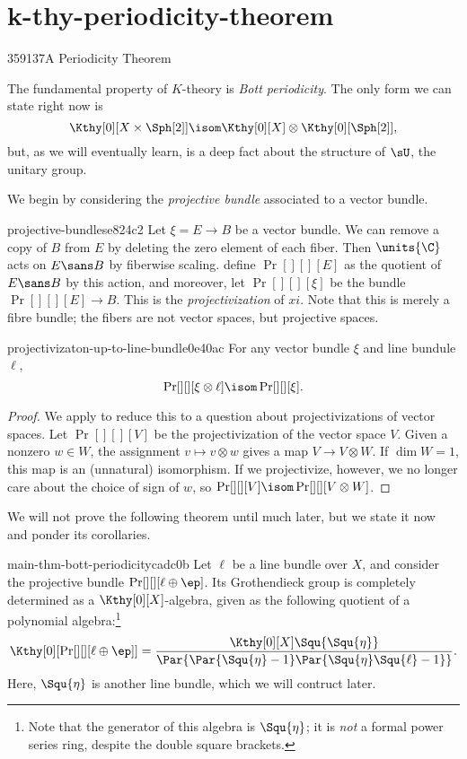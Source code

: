 \section{k-thy-periodicity-theorem}{359137}{A Periodicity Theorem}

The fundamental property of $K$-theory is \emph{Bott periodicity}. The only form we can
state right now is
\[ \Kthy[0][X \times {\Sph[2]}] \isom \Kthy[0][X] \otimes \Kthy[0][{\Sph[2]}], \]
but, as we will eventually learn, is a deep fact about the structure of $\sU$, the unitary
group.

We begin by considering the \emph{projective bundle} associated to a vector bundle.
\begin{defn}{projective-bundles}{e824c2}
  Let $\xi = E \to B$ be a vector bundle. We can remove a copy of $B$ from $E$ by deleting
  the zero element of each fiber. Then $\units{\C}$ acts on $E\sans B$ by fiberwise scaling.
  define $\Pr[][][E]$ as the quotient of $E\sans B$ by this action, and moreover, let
  $\Pr[][][\xi]$ be the bundle $\Pr[][][E] \to B$. This is the \emph{projectivization} of
  $xi$. Note that this is merely a fibre bundle; the fibers are not vector spaces, but
  projective spaces. 
\end{defn}

\begin{prop}{projectivizaton-up-to-line-bundle}{0e40ac}
  For any vector bundle $\xi$ and line bundule $\ell$,
  \[ \Pr[][][\xi \otimes \ell] \isom \Pr[][][\xi]. \]
\end{prop}
\begin{proof}
  We apply  to reduce this to a question about 
  projectivizations of vector spaces.
  Let $\Pr[][][V]$ be the projectivization of the vector space $V$. Given a nonzero $w\in W$,
  the assignment $v\mapsto v\otimes w$ gives a map $V \to V \otimes W$. If $\dim W = 1$,
  this map is an (unnatural) isomorphism. If we projectivize, however, we no longer care
  about the choice of sign of $w$, so $\Pr[][][V] \isom \Pr[][][V \otimes W]$.
\end{proof}

We will not prove the following theorem until much later, but we state it now
and ponder its corollaries.
\begin{thm}{main-thm-bott-periodicity}{cadc0b}
  Let $\ell$ be a line bundle over $X$, and consider the projective bundle 
  $\Pr[][][\ell \oplus \ep]$. Its Grothendieck group is completely determined as a 
  $\Kthy[0][X]$-algebra, given as the following quotient of a polynomial
  algebra:\footnote{Note that the generator of this algebra is $\Squ{\eta}$; it is
  \emph{not} a formal power series ring, despite the double square brackets.} 
  \[ \Kthy[0][{\Pr[][][\ell\oplus\ep]}] = 
      \frac{\Kthy[0][X]\Squ{\Squ{\eta}}}
        {\Par{\Par{\Squ{\eta}-1}\Par{\Squ{\eta}\Squ{\ell} - 1}}}. \]
  Here, $\Squ{\eta}$ is another line bundle, which we will contruct later.
\end{thm}

